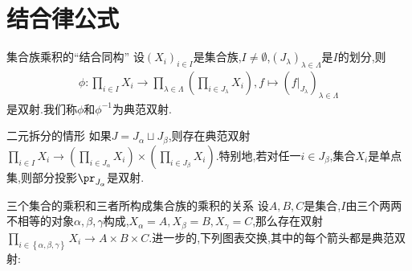 \section{结合律公式}

\begin{proposition}{集合族乘积的``结合同构''}{}
	设$\left(X_{i}\right)_{i\in I}$是集合族,$I\neq\emptyset$,$\left(J_{\lambda}\right)_{\lambda\in\Lambda}$是$I$的划分,则
	\begin{align*}
		\phi:\prod\limits_{i\in I}X_{i}\to\prod\limits_{\lambda\in\Lambda}\left(\prod\limits_{i\in J_{\lambda}}X_{i}\right),f\mapsto\left(f|_{J_{\lambda}}\right)_{\lambda\in\Lambda}
	\end{align*}
	是双射.我们称$\phi$和$\phi^{-1}$为典范双射.
\end{proposition}

\begin{remark}{二元拆分的情形}{}
	如果$J=J_{\alpha}\sqcup J_{\beta}$,则存在典范双射$\prod\limits_{i\in I}X_{i}\to\left(\prod\limits_{i\in J_{\alpha}}X_{i}\right)\times\left(\prod\limits_{i\in J_{\beta}}X_{i}\right)$.特别地,若对任一$i\in J_{\beta}$,集合$X_{i}$是单点集,则部分投影$\pr_{J_{\alpha}}$是双射.
\end{remark}

\begin{remark}{三个集合的乘积和三者所构成集合族的乘积的关系}{}
	设$A,B,C$是集合,$I$由三个两两不相等的对象$\alpha,\beta,\gamma$构成,$X_{\alpha}=A,X_{\beta}=B,X_{\gamma}=C$,那么存在双射$\prod\limits_{i\in\left\{\alpha,\beta,\gamma\right\}}X_{i}\to A\times B\times C$.进一步的,下列图表交换,其中的每个箭头都是典范双射:
	\begin{center}
	\end{center}
\end{remark}